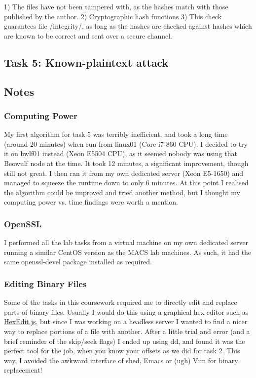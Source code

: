 		1) The files have not been tampered with, as the hashes match with those published by the author.
		2) Cryptographic hash functions
		3) This check guarantees file /integrity/, as long as the hashes are checked against hashes which are known to be correct and sent over a secure channel. 

	\pagebreak

	\subsection{Task 5: Known-plaintext attack}
		
	
	\pagebreak
	
	\subsection{Notes}
		\subsubsection{Computing Power}
			My first algorithm for task 5 was terribly inefficient, and took a long time (around 20 minutes) when run from linux01 (Core i7-860 CPU). 
			I decided to try it on bwlf01 instead (Xeon E5504 CPU), as it seemed nobody was using that Beowulf node at the time. It took 12 minutes, a significant improvement, though still not great.
			I then ran it from my own dedicated server (Xeon E5-1650)  and managed to squeeze the runtime down to only 6 minutes.
			At this point I realised the algorithm could be improved and tried another method, but I thought my computing power vs. time findings were worth a mention.
		\subsubsection{OpenSSL}
			I performed all the lab tasks from a virtual machine on my own dedicated server running a similar CentOS version as the MACS lab machines. As such, it had the same openssl-devel package installed as required.
		\subsubsection{Editing Binary Files}
			Some of the tasks in this coursework required me to directly edit and replace parts of binary files. Usually I would do this using a graphical hex editor such as \href{http://hexedit.duttke.de}{HexEdit.js}, but since I was working on a headless server I wanted to find a nicer way to replace portions of a file with another. 
			After a little trial and error (and a brief reminder of the skip/seek flags) I ended up using dd, and found it was the perfect tool for the job, when you know your offsets as we did for task 2.
			This way, I avoided the awkward interface of shed, Emacs or (ugh) Vim for binary replacement!  
			
